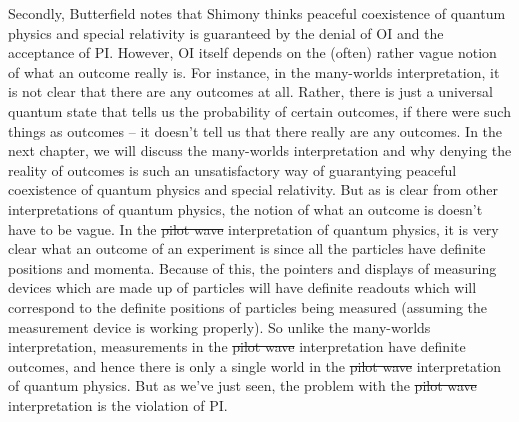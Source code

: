 \documentclass[12pt]{report}
\providecommand{\DIFadd}[1]{{\protect\color{blue}\uwave{#1}}} %
\providecommand{\DIFdel}[1]{{\protect\color{red}\sout{#1}}}                      %
\providecommand{\DIFaddbegin}{} %
\providecommand{\DIFaddend}{} %
\providecommand{\DIFdelbegin}{} %
\providecommand{\DIFdelend}{} %
\begin{document}
Secondly,  Butterfield notes that Shimony thinks peaceful coexistence of quantum physics and special relativity is guaranteed by the denial of OI and the acceptance of PI. However, OI itself depends on the (often) rather vague notion of what an outcome really is. For instance, in the many-worlds interpretation, it is not clear that there are any outcomes at all. Rather, there is just a universal quantum state that tells us the probability of certain outcomes, if there were such things as outcomes -- it doesn't tell us that there really are any outcomes. In the next chapter, we will discuss the many-worlds interpretation and why denying the reality of outcomes is such an unsatisfactory way of guarantying peaceful coexistence of quantum physics and special relativity. But as is clear from other interpretations of quantum physics, the notion of what an outcome is doesn't have to be vague. In the \DIFdelbegin \DIFdel{pilot wave }\DIFdelend \DIFaddbegin \DIFadd{Bohmian }\DIFaddend interpretation of quantum physics, it is very clear what an outcome of an experiment is since all the particles have definite positions and momenta. Because of this, the pointers and displays of measuring devices which are made up of particles will have definite readouts which will correspond to the definite positions of particles being measured (assuming the measurement device is working properly). So unlike the many-worlds interpretation, measurements in the \DIFdelbegin \DIFdel{pilot wave }\DIFdelend \DIFaddbegin \DIFadd{Bohmian }\DIFaddend interpretation have definite outcomes, and hence there is only a single world in the \DIFdelbegin \DIFdel{pilot wave }\DIFdelend \DIFaddbegin \DIFadd{Bohmian }\DIFaddend interpretation of quantum physics. But as we've just seen, the problem with the \DIFdelbegin \DIFdel{pilot wave }\DIFdelend \DIFaddbegin \DIFadd{Bohmian }\DIFaddend interpretation is the violation of PI.
\end{document}
